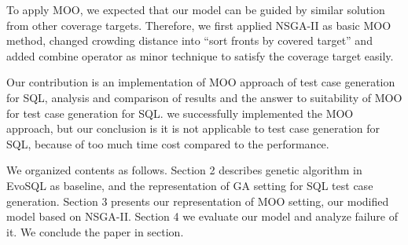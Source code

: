 To apply MOO, we expected that our model can be guided by similar solution from other coverage targets. Therefore, we first applied NSGA-II\cite{deb2002fast} as basic MOO method, changed crowding distance into ``sort fronts by covered target'' and added combine operator as minor technique to satisfy the coverage target easily.
 

Our contribution is an implementation of MOO approach of test case generation for SQL, analysis and comparison of results and the answer to suitability of MOO for test case generation for SQL. we successfully implemented the MOO approach, but our conclusion is it is not applicable to test case generation for SQL, because of too much time cost compared to the performance.

 
We organized contents as follows. Section 2 describes genetic algorithm in EvoSQL as baseline, and the representation of GA setting for SQL test case generation. Section 3 presents our representation of MOO setting, our modified model based on NSGA-II. Section 4 we evaluate our model and analyze failure of it. We conclude the paper in section.
